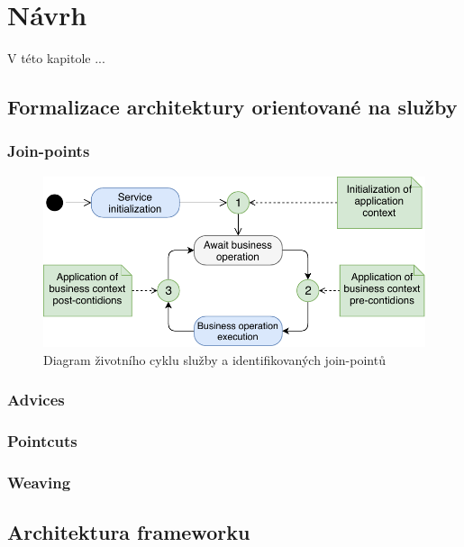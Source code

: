 

\chapter{Návrh}\label{ch:navrh}

V této kapitole ...

\section{Formalizace architektury orientované na služby}

\subsection{Join-points}

\begin{figure}
    \centering
    \includegraphics[keepaspectratio=true, width=0.8\linewidth]{figures/join-points.pdf}
    \caption{Diagram životního cyklu služby a identifikovaných join-pointů}
    \label{fig:join-points}
\end{figure} %

\subsection{Advices}

\subsection{Pointcuts}

\subsection{Weaving}

\section{Architektura frameworku}


